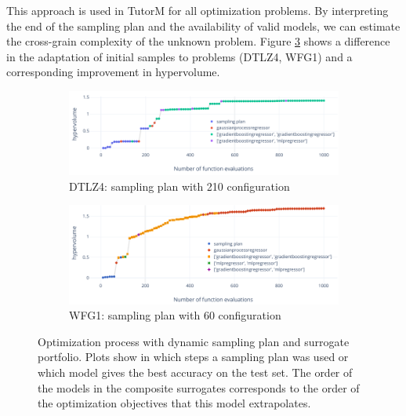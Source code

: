     This approach is used in TutorM for all optimization problems. By interpreting the end of the sampling plan and the availability of valid models, we can estimate the cross-grain complexity of the unknown problem. Figure \ref{fig:changing_models} shows a difference in the adaptation of initial samples to problems (DTLZ4, WFG1) and a corresponding improvement in hypervolume. 
    
        \begin{figure}[!h]
            \centering
            \begin{subfigure}{\textwidth} 
                \includegraphics[width=\textwidth]{content/images/dtlz4_models}
                \caption{DTLZ4: sampling plan with 210 configuration}
                \label{fig:dtlz4_models_210}
            \end{subfigure}
            
            \begin{subfigure}{\textwidth}
                \includegraphics[width=\textwidth]{content/images/wfg1_models}
                \caption{WFG1: sampling plan with 60 configuration}
                \label{fig:wfg1_models_60}
            \end{subfigure} 
    
            \caption[Optimization process with dynamic sampling plan and surrogate portfolio.]{Optimization process with dynamic sampling plan and surrogate portfolio. Plots show in which steps a sampling plan was used or which model gives the best accuracy on the test set. The order of the models in the composite surrogates corresponds to the order of the optimization objectives that this model extrapolates.}
            \label{fig:changing_models}    
        \end{figure}
    
